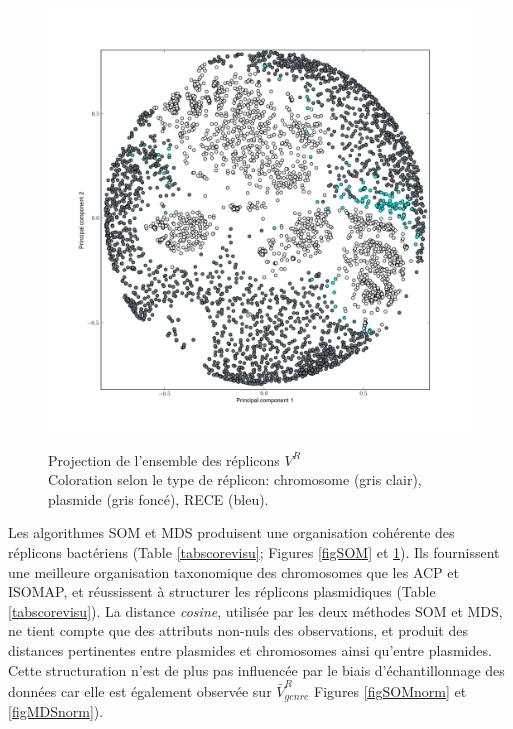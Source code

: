 \begin{figure}[H]
\begin{minipage}{0.50\textwidth}
	\label{figSOM}
	\end{minipage}
	\begin{minipage}{0.50\textwidth}
	\includegraphics[trim=3cm 3cm 2cm 2cm, clip, width=\textwidth]{./img/MDS_cosine.png}
	\label{figMDS}
	\end{minipage}	

	\caption[Projection de l’ensemble des réplicons]{Projection de l’ensemble des réplicons $V^{R}$\\ \medskip Coloration selon le type de réplicon: chromosome (gris clair), plasmide (gris foncé), RECE (bleu).} 
\end{figure}  

Les algorithmes SOM et MDS produisent une organisation cohérente des réplicons bactériens (Table \ref{tabscorevisu}; Figures \ref{figSOM} et \ref{figMDS}). Ils fournissent une meilleure organisation taxonomique des chromosomes que les ACP et ISOMAP, et réussissent à structurer les réplicons plasmidiques (Table \ref{tabscorevisu}). La distance \textit{cosine}, utilisée par les deux méthodes SOM et MDS, ne tient compte que des attributs non-nuls des observations, et produit des distances pertinentes entre plasmides et chromosomes ainsi qu’entre plasmides. Cette structuration n'est de plus pas influencée par le biais d’échantillonnage des données car elle est également observée sur $\bar{V}^{R}_{genre}$ Figures \ref{figSOMnorm} et \ref{figMDSnorm}). 
 
